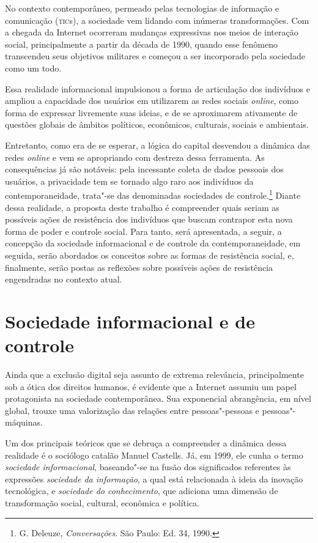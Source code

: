 No contexto contemporâneo, permeado pelas tecnologias de informação e
comunicação (\textsc{tic}s), a sociedade vem lidando com inúmeras transformações.
Com a chegada da Internet ocorreram mudanças expressivas nos meios de
interação social, principalmente a partir da década de 1990, quando esse
fenômeno transcendeu seus objetivos militares e começou a ser
incorporado pela sociedade como um todo.

Essa realidade informacional impulsionou a forma de articulação dos
indivíduos e ampliou a capacidade dos usuários em utilizarem as redes
sociais \textit{online}, como forma de expressar livremente suas ideias, e de se
aproximarem ativamente de questões globais de âmbitos políticos,
econômicos, culturais, sociais e ambientais.

Entretanto, como era de se esperar, a lógica do capital desvendou a
dinâmica das redes \textit{online} e vem se apropriando com destreza dessa
ferramenta. As consequências já são notáveis: pela incessante coleta de
dados pessoais dos usuários, a privacidade tem se tornado algo raro aos
indivíduos da contemporaneidade, trata"-se das denominadas sociedades de
controle.\footnote{G. Deleuze, \textit{Conversações}. São Paulo: Ed. 34, 1990.} Diante dessa realidade, a proposta deste
trabalho é compreender quais seriam as possíveis ações de resistência
dos indivíduos que buscam contrapor esta nova forma de poder e controle
social. Para tanto, será apresentada, a seguir, a concepção da sociedade
informacional e de controle da contemporaneidade, em seguida, serão
abordados os conceitos sobre as formas de resistência social, e,
finalmente, serão postas as reflexões sobre possíveis ações de
resistência engendradas no contexto atual.

\section{Sociedade informacional e de controle}

Ainda que a exclusão digital seja assunto de extrema relevância,
principalmente sob a ótica dos direitos humanos, é evidente que a
Internet assumiu um papel protagonista na sociedade contemporânea. Sua
exponencial abrangência, em nível global, trouxe uma valorização das
relações entre pessoas"-pessoas e pessoas"-máquinas.

Um dos principais teóricos que se debruça a compreender a dinâmica dessa
realidade é o sociólogo catalão Manuel Castells. Já, em 1999, ele cunha
o termo \textit{sociedade informacional}, baseando"-se na fusão dos
significados referentes às expressões \textit{sociedade da informação}, a
qual está relacionada à ideia da inovação tecnológica, e \textit{sociedade do conhecimento}, que adiciona uma dimensão de transformação social,
cultural, econômica e política.

